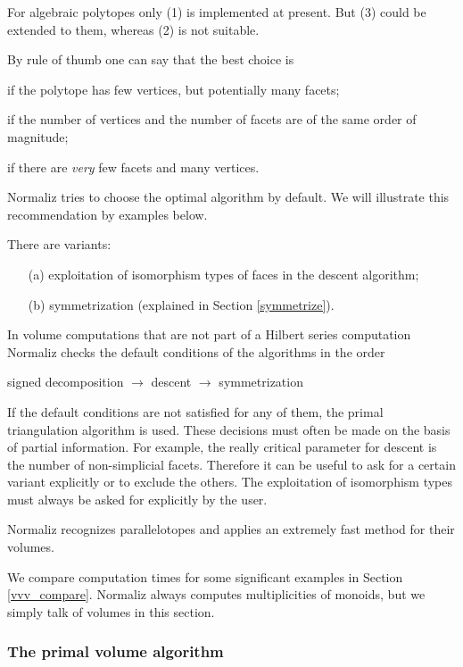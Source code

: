 For algebraic polytopes only (1) is implemented at present. But (3) could be extended to them, whereas (2) is not suitable.

By rule of thumb one can say that  the best choice is
\begin{arab}
\item if the polytope has few vertices, but potentially many facets;
\item  if the number of vertices and the number of facets are of the same order of magnitude;
\item  if there are \emph{very} few facets and many vertices.
\end{arab}
Normaliz tries to choose the optimal algorithm by default. We will illustrate this recommendation by examples below.

There are variants:
\begin{enumerate}
\item[(a)] exploitation of isomorphism types of faces in the descent algorithm;
\item[(b)] symmetrization (explained in Section \ref{symmetrize}).
\end{enumerate}

In volume computations that are not part of a Hilbert series computation Normaliz checks the default conditions of the algorithms in the order
\begin{center}
signed decomposition $\to$  descent  $\to$ symmetrization
\end{center}
If the default conditions are not satisfied for any of them, the primal triangulation algorithm is used. These decisions must often be made on the basis of partial information. For example, the really critical parameter for descent is the number of non-simplicial facets. Therefore it can be useful to ask for a certain variant explicitly or to exclude the others. The exploitation of isomorphism types must always be asked for explicitly by the user.

Normaliz recognizes parallelotopes and applies an extremely fast method for their volumes.

We compare computation times for some significant examples in Section \ref{vvv_compare}. Normaliz always computes multiplicities of monoids, but we simply talk of volumes in this section.

\subsubsection{The primal volume algorithm}

